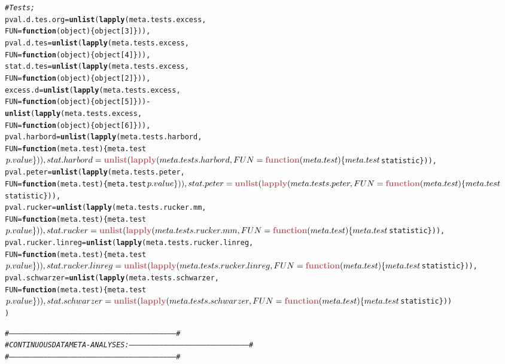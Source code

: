 \documentclass[11pt,a4paper,twoside]{book}\usepackage[]{graphicx}\usepackage[]{color}
\makeatletter
\newcommand{\hlcom}[1]{\textcolor[rgb]{0.678,0.584,0.686}{\textit{#1}}}%
\newcommand{\hlkwd}[1]{\textcolor[rgb]{0.737,0.353,0.396}{\textbf{#1}}}%
\newenvironment{kframe}{%
 \def\at@end@of@kframe{}%
 \ifinner\ifhmode%
  \def\at@end@of@kframe{\end{minipage}}%
  \begin{minipage}{\columnwidth}%
 \fi\fi%
 \def\FrameCommand##1{\hskip\@totalleftmargin \hskip-\fboxsep
 \colorbox{shadecolor}{##1}\hskip-\fboxsep
     \hskip-\linewidth \hskip-\@totalleftmargin \hskip\columnwidth}%
 \MakeFramed {\advance\hsize-\width
   \@totalleftmargin\z@ \linewidth\hsize
   \@setminipage}}%
 {\par\unskip\endMakeFramed%
 \at@end@of@kframe}
\newenvironment{knitrout}{}{} %
\makeatother
\begin{document}
\begin{knitrout}
\begin{kframe}
\begin{alltt}
\hlcom{  #Tests;}
  pval.d.tes.org = \hlkwd{unlist}(\hlkwd{lapply}(meta.tests.excess, 
                                 FUN = \hlkwd{function}(object)\{object[3]\})),
  pval.d.tes = \hlkwd{unlist}(\hlkwd{lapply}(meta.tests.excess, 
                             FUN = \hlkwd{function}(object)\{object[4]\})),
  stat.d.tes = \hlkwd{unlist}(\hlkwd{lapply}(meta.tests.excess, 
                             FUN = \hlkwd{function}(object)\{object[2]\})),
  excess.d = \hlkwd{unlist}(\hlkwd{lapply}(meta.tests.excess, 
                           FUN = \hlkwd{function}(object)\{object[5]\})) - 
    \hlkwd{unlist}(\hlkwd{lapply}(meta.tests.excess, 
                  FUN = \hlkwd{function}(object)\{object[6]\})),
  pval.harbord = \hlkwd{unlist}(\hlkwd{lapply}(meta.tests.harbord, 
                               FUN = \hlkwd{function}(meta.test)\{meta.test$p.value\})),
  stat.harbord = \hlkwd{unlist}(\hlkwd{lapply}(meta.tests.harbord, 
                               FUN = \hlkwd{function}(meta.test)\{meta.test$statistic\})),
  pval.peter = \hlkwd{unlist}(\hlkwd{lapply}(meta.tests.peter, 
                             FUN = \hlkwd{function}(meta.test)\{meta.test$p.value\})),
  stat.peter = \hlkwd{unlist}(\hlkwd{lapply}(meta.tests.peter, 
                             FUN = \hlkwd{function}(meta.test)\{meta.test$statistic\})),
  pval.rucker = \hlkwd{unlist}(\hlkwd{lapply}(meta.tests.rucker.mm, 
                              FUN = \hlkwd{function}(meta.test)\{meta.test$p.value\})),
  stat.rucker = \hlkwd{unlist}(\hlkwd{lapply}(meta.tests.rucker.mm, 
                              FUN = \hlkwd{function}(meta.test)\{meta.test$statistic\})),
  pval.rucker.linreg = \hlkwd{unlist}(\hlkwd{lapply}(meta.tests.rucker.linreg, 
                              FUN = \hlkwd{function}(meta.test)\{meta.test$p.value\})),
  stat.rucker.linreg = \hlkwd{unlist}(\hlkwd{lapply}(meta.tests.rucker.linreg, 
                              FUN = \hlkwd{function}(meta.test)\{meta.test$statistic\})),
  pval.schwarzer = \hlkwd{unlist}(\hlkwd{lapply}(meta.tests.schwarzer, 
                              FUN = \hlkwd{function}(meta.test)\{meta.test$p.value\})),
  stat.schwarzer = \hlkwd{unlist}(\hlkwd{lapply}(meta.tests.schwarzer, 
                              FUN = \hlkwd{function}(meta.test)\{meta.test$statistic\}))
)



\hlcom{#--------------------------------------------------------------------------------------------------------------------#}
\hlcom{# CONTINUOUS DATA META-ANALYSES: ------------------------------------------------------------------------------------#}
\hlcom{#--------------------------------------------------------------------------------------------------------------------#}



\end{alltt}
\end{kframe}
\end{knitrout}
\end{document}
